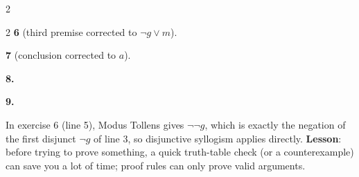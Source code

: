 \begin{nbsolution}
\begin{multicols}{2}
\begin{fitchproof}
 \RPrem
{} \RPrem
{} \RPrem
{} 
 
 
 
 
 
\end{fitchproof}
\end{multicols}
\begin{multicols}{2}
\textbf{6} (third premise corrected to $\neg g \lor m$).
\begin{fitchproof}
 \RPrem
{} \RPrem
{} \RPrem
{} 
 
 
\end{fitchproof}
\textbf{7} (conclusion corrected to $a$).
\begin{fitchproof}
 \RPrem
{} \RPrem
{} 
 
 
 
 
 
\end{fitchproof}
\columnbreak
\textbf{8.}
\begin{fitchproof}
 \RPrem
{} \RPrem
{} \RPrem
\open
{} \RAss
{} 
 
 
 
\close
{} 
\end{fitchproof}
\textbf{9.}
\begin{fitchproof}
 \RPrem
{} \RPrem
{} \RPrem
\open
{} \RAss
{} 
 
 
 
 
 
\close
{} 
\end{fitchproof}
\end{multicols}
In exercise 6 (line 5), Modus Tollens gives $\neg\neg g$, which is exactly the negation of
the first disjunct $\neg g$ of line 3, so disjunctive syllogism applies directly.
\textbf{Lesson}: before trying to prove something, a quick truth-table check (or a
counterexample) can save you a lot of time; proof rules can only prove valid arguments.
\end{nbsolution}

